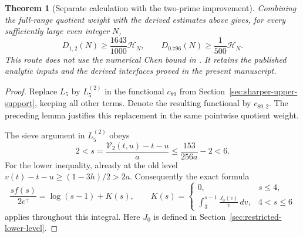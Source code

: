 \documentclass[11pt]{article}
\newtheorem{theorem}{Theorem}
\newcommand{\HN}{\mathcal H_N}
\begin{document}
\begin{theorem}[Separate calculation with the two-prime improvement]
\label{thm:double-prefix-chen}
Combining the full-range quotient weight with the derived estimates
above gives, for every sufficiently large even integer $N$,
\[
 D_{1,2}(N)\ge\frac{1643}{1000}\HN,
 \qquad D_{0.796}(N)\ge\frac1{500}\HN.
\]
This route does not use the numerical Chen bound in \cite{Li2026}.
It retains the published analytic inputs and the derived interfaces
proved in the present manuscript.
\end{theorem}
\begin{proof}
Replace $L_5$ by $L_5^{(2)}$ in the functional $c_{89}$ from
Section~\ref{sec:sharper-upper-support}, keeping all other terms.
Denote the resulting functional by $c_{89,2}$. The preceding lemma
justifies this replacement in the same pointwise quotient weight.

The sieve argument in $L_5^{(2)}$ obeys
\[
 2<s=\frac{\mathcal V_2(t,u)-t-u}{a}
 \le\frac{153}{256a}-2<6.
\]
For the lower inequality, already at the old level
$v(t)-t-u\ge(1-3h)/2>2a$.
Consequently the exact formula
\[
 \frac{s f(s)}{2e^\gamma}
   =\log(s-1)+K(s),\qquad
 K(s)=\begin{cases}
 0,&s\le4,\\
 \displaystyle\int_3^{s-1}\frac{J_0(v)}v\,dv,&4<s\le6
 \end{cases}
\]
applies throughout this integral. Here $J_0$ is defined in
Section~\ref{sec:restricted-lower-level}.


\end{proof}
\end{document}
